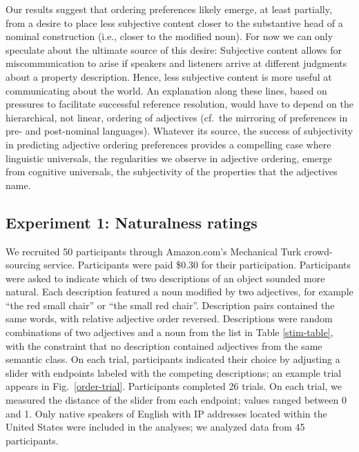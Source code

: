 \documentclass{pnastwo}
\begin{document}
\begin{article}
Our results suggest that ordering preferences likely emerge, at least partially, from a desire to place less subjective content closer to the substantive head of a nominal construction (i.e., closer to the modified noun). 
For now we can only speculate about the ultimate source of this desire: Subjective content allows for miscommunication to arise if speakers and listeners arrive at different judgments about a property description. Hence, less subjective content is more useful at communicating about the world. 
An explanation along these lines, based on pressures to facilitate successful reference resolution, would have to depend on the hierarchical, not linear, ordering of adjectives (cf.~the mirroring of preferences in pre- and post-nominal languages). 
Whatever its source, the success of subjectivity in predicting adjective ordering preferences provides a compelling case where linguistic universals, the regularities we observe in adjective ordering, emerge from cognitive universals, the subjectivity of the properties that the adjectives name.



\begin{materials}
\section{Experiment 1: Naturalness ratings}	
We recruited 50 participants through Amazon.com's Mechanical Turk crowd-sourcing service. Participants were paid \$0.30 for their participation.
Participants were asked to indicate which of two descriptions of an object sounded more natural. Each description featured a noun modified by two adjectives, for example ``the red small chair'' or ``the small red chair''. Description pairs contained the same words, with relative adjective order reversed. Descriptions were random combinations of two adjectives and a noun from the list in Table \ref{stim-table}, with the constraint that no description contained adjectives from the same semantic class.
On each trial, participants indicated their choice by adjusting a slider with endpoints labeled with the competing descriptions; an example trial appears in Fig.\ \ref{order-trial}. Participants completed 26 trials. On each trial, we measured the distance of the slider from each endpoint; values ranged between 0 and 1. Only native speakers of English with IP addresses located within the United States were included in the analyses; we analyzed data from 45 participants. 


\end{materials}
\end{article}
\end{document}
